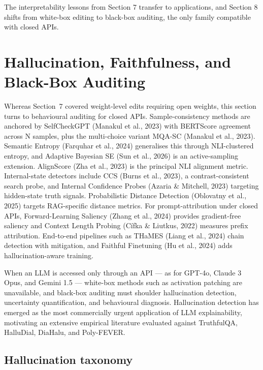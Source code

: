 The interpretability lessons from Section 7 transfer to applications, and Section 8 shifts from white-box editing to black-box auditing, the only family compatible with closed APIs.

\section{Hallucination, Faithfulness, and Black-Box Auditing}\label{hallucination-faithfulness-and-black-box-auditing}

Whereas Section~7 covered weight-level edits requiring open weights, this section turns to behavioural auditing for closed APIs. Sample-consistency methods are anchored by SelfCheckGPT (Manakul et al., 2023) with BERTScore agreement across N samples, plus the multi-choice variant MQA-SC (Manakul et al., 2023). Semantic Entropy (Farquhar et al., 2024) generalises this through NLI-clustered entropy, and Adaptive Bayesian SE (Sun et al., 2026) is an active-sampling extension. AlignScore (Zha et al., 2023) is the principal NLI alignment metric. Internal-state detectors include CCS (Burns et al., 2023), a contrast-consistent search probe, and Internal Confidence Probes (Azaria \& Mitchell, 2023) targeting hidden-state truth signals. Probabilistic Distance Detection (Oblovatny et al., 2025) targets RAG-specific distance metrics. For prompt-attribution under closed APIs, Forward-Learning Saliency (Zhang et al., 2024) provides gradient-free saliency and Context Length Probing (Cífka \& Liutkus, 2022) measures prefix attribution. End-to-end pipelines such as THaMES (Liang et al., 2024) chain detection with mitigation, and Faithful Finetuning (Hu et al., 2024) adds hallucination-aware training.

When an LLM is accessed only through an API --- as for GPT-4o, Claude 3 Opus, and Gemini 1.5 --- white-box methods such as activation patching are unavailable, and black-box auditing must shoulder hallucination detection, uncertainty quantification, and behavioural diagnosis. Hallucination detection has emerged as the most commercially urgent application of LLM explainability, motivating an extensive empirical literature evaluated against TruthfulQA, HalluDial, DiaHalu, and Poly-FEVER.

\subsection{Hallucination taxonomy}\label{hallucination-taxonomy}

